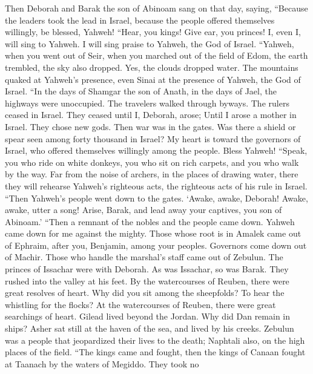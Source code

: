  Then Deborah and Barak the son of Abinoam sang on that day,
saying,  ``Because the leaders took the lead in Israel,
because the people offered themselves willingly, be blessed, Yahweh!
 ``Hear, you kings! Give ear, you princes! I, even I, will
sing to Yahweh. I will sing praise to Yahweh, the God of Israel.
 ``Yahweh, when you went out of Seir, when you marched out
of the field of Edom, the earth trembled, the sky also dropped. Yes, the
clouds dropped water.  The mountains quaked at Yahweh's
presence, even Sinai at the presence of Yahweh, the God of Israel.
 ``In the days of Shamgar the son of Anath, in the days of
Jael, the highways were unoccupied. The travelers walked through byways.
 The rulers ceased in Israel. They ceased until I, Deborah,
arose; Until I arose a mother in Israel.  They chose new
gods. Then war was in the gates. Was there a shield or spear seen among
forty thousand in Israel?  My heart is toward the governors
of Israel, who offered themselves willingly among the people. Bless
Yahweh!  ``Speak, you who ride on white donkeys, you who
sit on rich carpets, and you who walk by the way.  Far from
the noise of archers, in the places of drawing water, there they will
rehearse Yahweh's righteous acts, the righteous acts of his rule in
Israel. ``Then Yahweh's people went down to the gates. 
`Awake, awake, Deborah! Awake, awake, utter a song! Arise, Barak, and
lead away your captives, you son of Abinoam.'  ``Then a
remnant of the nobles and the people came down. Yahweh came down for me
against the mighty.  Those whose root is in Amalek came out
of Ephraim, after you, Benjamin, among your peoples. Governors come down
out of Machir. Those who handle the marshal's staff came out of Zebulun.
 The princes of Issachar were with Deborah. As was
Issachar, so was Barak. They rushed into the valley at his feet. By the
watercourses of Reuben, there were great resolves of heart.
 Why did you sit among the sheepfolds? To hear the
whistling for the flocks? At the watercourses of Reuben, there were
great searchings of heart.  Gilead lived beyond the Jordan.
Why did Dan remain in ships? Asher sat still at the haven of the sea,
and lived by his creeks.  Zebulun was a people that
jeopardized their lives to the death; Naphtali also, on the high places
of the field.  ``The kings came and fought, then the kings
of Canaan fought at Taanach by the waters of Megiddo. They took no

